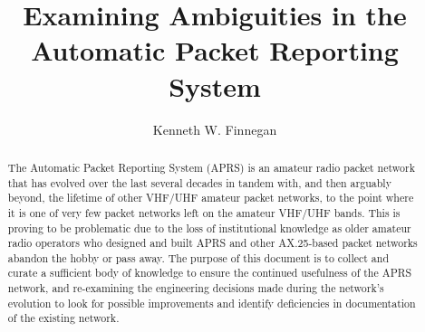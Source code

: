 \documentclass[11pt]{ucthesis}
\begin{document}
\title{Examining Ambiguities in the Automatic Packet Reporting System}
\author{Kenneth W. Finnegan}
  
 
  
 
\maketitle

\begin{frontmatter}

\copyrightpage
\committeemembershippage

\begin{abstract}
The Automatic Packet Reporting System (APRS) is an amateur radio packet 
network that has evolved over the last several decades in tandem with, 
and then arguably beyond, the lifetime of other VHF/UHF amateur packet
networks, to the point where it is one of very few packet networks left
on the amateur VHF/UHF bands. This is proving to be problematic due to
the loss of institutional knowledge as older amateur radio operators who
designed and built APRS and other AX.25-based packet networks abandon
the hobby or pass away. The purpose of this document is to 
collect and curate a sufficient body of knowledge to ensure the 
continued usefulness of the APRS network, and re-examining 
the engineering decisions made during the network's evolution to look for
possible improvements and identify deficiencies in documentation of
the existing network.
\end{abstract}

\tableofcontents
\listoffigures
\end{frontmatter}









\begin{appendices}


\end{appendices}
\end{document}
